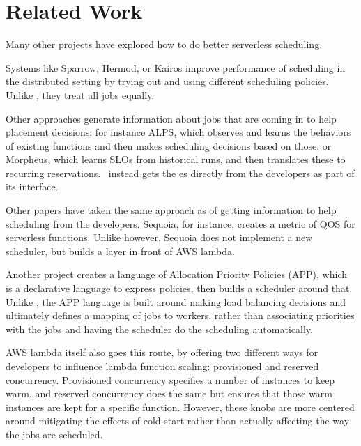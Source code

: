 \section{Related Work}

Many other projects have explored how to do better serverless scheduling.
 
Systems like Sparrow\cite{sparrow}, Hermod\cite{hermod}, or Kairos\cite{kairos}
improve performance of scheduling in the distributed setting by trying out and
using different scheduling policies. Unlike \sys{}, they treat all jobs equally.


Other approaches generate information about jobs that are coming in to help
placement decisions; for instance ALPS\cite{alps}, which observes and learns the
behaviors of existing functions and then makes scheduling decisions based on
those; or Morpheus\cite{morpheus}, which learns SLOs from historical runs, and
then translates these to recurring reservations.~\Sys{} instead gets the
\class{}es directly from the developers as part of its interface.


Other papers have taken the same approach as \sys{} of getting information to
help scheduling from the developers. Sequoia\cite{sequoia}, for instance,
creates a metric of QOS for serverless functions. Unlike \sys{} however, Sequoia
does not implement a new scheduler, but builds a layer in front of AWS lambda. 

Another project\cite{app-paper} creates a language of Allocation Priority Policies
(APP), which is a declarative language to express policies, then builds a
scheduler around that. Unlike \sys{}, the APP language is built around making
load balancing decisions and ultimately defines a mapping of jobs to workers,
rather than associating priorities with the jobs and having the scheduler do the
scheduling automatically.

AWS lambda itself also goes this route, by offering two different ways for
developers to influence lambda function scaling: provisioned and reserved
concurrency\cite{aws-scaling}. Provisioned concurrency specifies a number of
instances to keep warm, and reserved concurrency does the same but ensures that
those warm instances are kept for a specific function. However, these knobs are
more centered around mitigating the effects of cold start rather than actually
affecting the way the jobs are scheduled.
